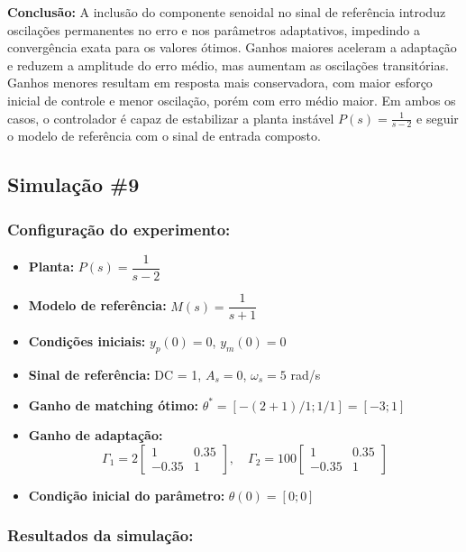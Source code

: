 \documentclass[10pt]{article}
\begin{document}
\textbf{Conclusão:} A inclusão do componente senoidal no sinal de referência introduz oscilações permanentes no erro e nos parâmetros adaptativos, impedindo a convergência exata para os valores ótimos. Ganhos maiores aceleram a adaptação e reduzem a amplitude do erro médio, mas aumentam as oscilações transitórias. Ganhos menores resultam em resposta mais conservadora, com maior esforço inicial de controle e menor oscilação, porém com erro médio maior. Em ambos os casos, o controlador é capaz de estabilizar a planta instável $P(s) = \frac{1}{s-2}$ e seguir o modelo de referência com o sinal de entrada composto.

\newpage

\subsection{Simulação \#9}
\subsubsection{Configuração do experimento:}
\begin{itemize}
\item \textbf{Planta:} $P(s) = \dfrac{1}{s - 2}$
\item \textbf{Modelo de referência:} $M(s) = \dfrac{1}{s + 1}$
\item \textbf{Condições iniciais:} $y_p(0)=0$, $y_m(0)=0$
\item \textbf{Sinal de referência:} DC = 1, $A_s=0$, $\omega_s=5$ rad/s
\item \textbf{Ganho de matching ótimo:} $\theta^* = [-(2+1)/1;1/1] = [-3;1]$
\item \textbf{Ganho de adaptação:} 
\[
\Gamma_1 = 2 \begin{bmatrix} 1 & 0.35 \\ -0.35 & 1 \end{bmatrix}, \quad
\Gamma_2 = 100 \begin{bmatrix} 1 & 0.35 \\ -0.35 & 1 \end{bmatrix}
\]
\item \textbf{Condição inicial do parâmetro:} $\theta(0) = [0;0]$
\end{itemize}

\subsubsection{Resultados da simulação:}
\end{document}
